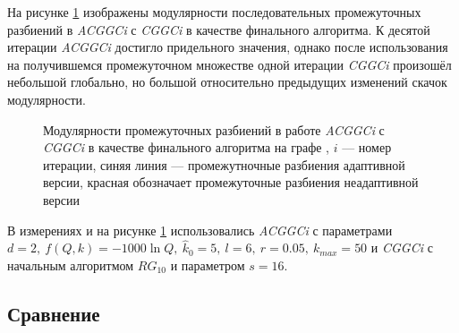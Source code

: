 На рисунке \ref{fig:es-final} изображены модулярности последовательных промежуточных разбиений в \emph{ACGGCi} с \emph{CGGCi} в качестве финального алгоритма. К десятой итерации \emph{ACGGCi} достигло придельного значения, однако после использования на получившемся промежуточном множестве одной итерации \emph{CGGCi} произошёл небольшой глобально, но большой относительно предыдущих изменений скачок модулярности.

\begin{figure}[H]
	\caption{Модулярности промежуточных разбиений в работе \emph{ACGGCi} с \emph{CGGCi} в качестве финального алгоритма на графе \emph{\celegans}, $i$ --- номер итерации, синяя линия --- промежутночные разбиения адаптивной версии, красная обозначает промежуточные разбиения неадаптивной версии}
	\label{fig:es-final}
\end{figure}

В измерениях и на рисунке \ref{fig:es-final} использовались \emph{ACGGCi} с параметрами $d = 2,\ f(Q, k) = -1000 \ln Q,\ \hat{k}_0 = 5,\ l = 6,\ r = 0.05,\ k_{max} = 50$ и \emph{CGGCi} с начальным алгоритмом $RG_{10}$ и параметром $s = 16$.



\subsection{Сравнение}
\label{subsec:acggc-res}

